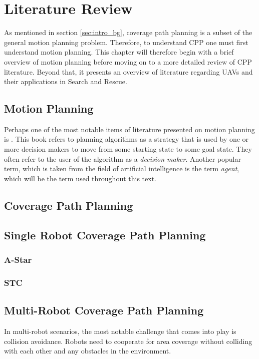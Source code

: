 \chapter{Literature Review}
\label{chp:back}
As mentioned in section \ref{sec:intro_bg}, coverage path planning is a subset of the general motion planning problem. Therefore, to understand CPP one must first understand motion planning. This chapter will therefore begin with a brief overview of motion planning before moving on to a more detailed review of CPP literature. Beyond that, it presents an overview of literature regarding UAVs and their applications in Search and Rescue.

\section{Motion Planning}
Perhaps one of the most notable items of literature presented on motion planning is \cite{Lavalle2006}. This book refers to planning algorithms as a strategy that is used by one or more decision makers to move from some starting state to some goal state. They often refer to the user of  the algorithm as a \emph{decision maker}. Another popular term, which is taken from the field of artificial intelligence is the term \emph{agent}, which will be the  term used throughout this text.

\section{Coverage Path Planning}


\section{Single Robot Coverage Path Planning}
\subsection{A-Star}
\subsection{STC}

\section{Multi-Robot Coverage Path Planning}
In multi-robot scenarios, the most notable challenge that comes into play is collision avoidance. Robots need to cooperate for area coverage without colliding with each other and any obstacles in the environment.

